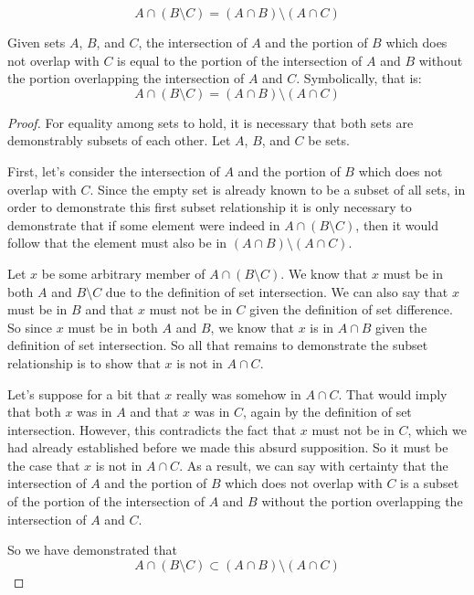 \documentclass[main.tex]{subfiles}
\begin{document}
\subproblem{}\label{2g}
\[A \cap (B \setminus C) = (A \cap B) \setminus (A \cap C)\]
\begin{thm}
	Given sets \(A\), \(B\), and \(C\), the intersection of \(A\) and the
	portion of \(B\) which does not overlap with \(C\) is equal to the
	portion of the intersection of \(A\) and \(B\) without the portion
	overlapping the intersection of \(A\) and \(C\). Symbolically, that is:
	\[A \cap (B \setminus C) = (A \cap B) \setminus (A \cap C)\]
\end{thm}
\begin{proof}
	For equality among sets to hold, it is necessary that both sets are
	demonstrably subsets of each other. Let \(A\), \(B\), and \(C\) be sets.

	\medskip
	First, let's consider the intersection of \(A\) and the portion of \(B\)
	which does not overlap with \(C\). Since the empty set is already known
	to be a subset of all sets, in order to demonstrate this first subset
	relationship it is only necessary to demonstrate that if some element
	were indeed in \(A \cap (B \setminus C)\), then it would follow that the
	element must also be in \((A \cap B) \setminus (A \cap C)\).

	Let \(x\) be some arbitrary member of \(A \cap (B \setminus C)\). We
	know that \(x\) must be in both \(A\) and \(B \setminus C\) due to the
	definition of set intersection. We can also say that \(x\) must be in
	\(B\) and that \(x\) must not be in \(C\) given the definition of set
	difference. So since \(x\) must be in both \(A\) and \(B\), we know that
	\(x\) is in \(A \cap B\) given the definition of set intersection. So
	all that remains to demonstrate the subset relationship is to show that
	\(x\) is not in \(A \cap C\).

	Let's suppose for a bit that \(x\) really was somehow in \(A \cap C\).
	That would imply that both \(x\) was in \(A\) and that \(x\) was in
	\(C\), again by the definition of set intersection. However, this
	contradicts the fact that \(x\) must not be in \(C\), which we had
	already established before we made this absurd supposition. So it must
	be the case that \(x\) is not in \(A \cap C\). As a result, we can say
	with certainty that the intersection of \(A\) and the portion of \(B\)
	which does not overlap with \(C\) is a subset of the portion of the
	intersection of \(A\) and \(B\) without the portion overlapping the
	intersection of \(A\) and \(C\).

	So we have demonstrated that
	\[A \cap (B \setminus C) \subset (A \cap B) \setminus (A \cap C)\]


\end{proof}
\end{document}
